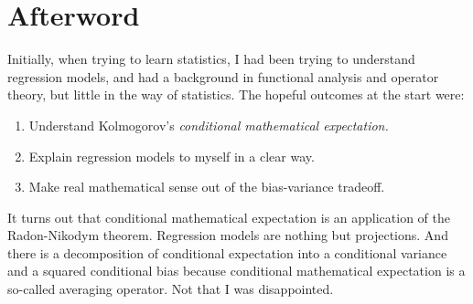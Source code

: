 \documentclass[
twoside=true,
paper=letter,
fontsize=9pt,
pagesize=auto,
leqno,
openany,
headsepline,
overfullrule,
]{scrbook}
\theoremstyle{plain}
\theoremstyle{plain}
\theoremstyle{definition}
\theoremstyle{bfnoteitalic}
\theoremstyle{bfnoteroman}
\begin{document}
\chapter{Afterword}
Initially, when trying to learn statistics, I had been trying to understand regression models, and had a background in functional analysis and operator theory, but little in the way of statistics.
The hopeful outcomes at the start were:
\begin{enumerate}
\item
Understand Kolmogorov's \emph{conditional mathematical expectation.}
\item
Explain regression models to myself in a clear way.
\item
Make real mathematical sense out of the bias-variance tradeoff.
\end{enumerate}
It turns out that
conditional mathematical expectation is an application of the Radon-Nikodym theorem.
Regression models are nothing but projections.
And there is a decomposition of  conditional expectation into a conditional variance and a squared conditional bias because conditional mathematical expectation is a so-called averaging operator.
Not that I was disappointed.


\backmatter




\printnomenclature
\printindex
\end{document}
